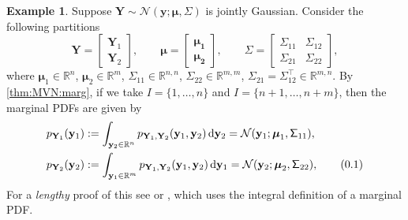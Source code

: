 \documentclass[10pt]{article}
\theoremstyle{definition}
\newtheorem{exmp}{Example}[section]
\newcommand\eqnum{\addtocounter{equation}{1}\tag{\arabic{section}.\arabic{equation}}}
\DeclareMathOperator{\df}{d\!}
\begin{document}
\begin{exmp}
Suppose $\mathbf{Y}\sim\mathcal{N}(\mathcal{\mathbf{y}; \boldsymbol{\mu}, \mathsf{\Sigma}})$ is jointly Gaussian. Consider the following partitions
\begin{equation}
\mathbf{Y} =
\begin{bmatrix}
\mathbf{Y}_1 \\
\mathbf{Y}_2
\end{bmatrix}, \qquad
\boldsymbol{\mu} = 
\begin{bmatrix}
\boldsymbol{\mu_1} \\
\boldsymbol{\mu_2}
\end{bmatrix}, \qquad
\mathsf{\Sigma} = 
\begin{bmatrix}
\mathsf{\Sigma}_{11} & \mathsf{\Sigma}_{12} \\
\mathsf{\Sigma}_{21} & \mathsf{\Sigma}_{22}
\end{bmatrix},
\end{equation}
where $\boldsymbol{\mu}_1\in\mathbb{R}^n$, $\boldsymbol{\mu}_2\in\mathbb{R}^m$, $\mathsf{\Sigma}_{11}\in\mathbb{R}^{n,n}$, $\mathsf{\Sigma}_{22}\in\mathbb{R}^{m,m}$, $\mathsf{\Sigma}_{21} = \mathsf{\Sigma}_{12}^{\top}\in\mathbb{R}^{m,n}$. By \cref{thm:MVN:marg}, if we take $I=\{1,\dots,n\}$ and  $I=\{n+1,\dots,n+m\}$, then the marginal PDFs are given by
\begin{align*}
p_{\mathbf{Y}_1}(\mathbf{y}_1) &:= \int_{\mathbf{y}_2\in\mathbb{R}^n}p_{\mathbf{Y}_1,\mathbf{Y}_2}(\mathbf{y}_1, \mathbf{y}_2)\df \mathbf{y}_2 = \mathcal{N}(\mathbf{y}_1; \boldsymbol{\mu}_1, \mathsf{\Sigma}_{11}), \\
p_{\mathbf{Y}_2}(\mathbf{y}_2) &:= \int_{\mathbf{y}_1\in\mathbb{R}^m}p_{\mathbf{Y}_1,\mathbf{Y}_2}(\mathbf{y}_1, \mathbf{y}_2)\df \mathbf{y}_1 = \mathcal{N}(\mathbf{y}_2; \boldsymbol{\mu}_2, \mathsf{\Sigma}_{22}),
\eqnum
\label{eq:MVN:marg}
\end{align*}
For a \textit{lengthy} proof of this see \cite{Do2009} or \cite[Section 2.3.2]{Bishop2006}, which uses the integral definition of a marginal PDF.
\end{exmp}
\end{document}
